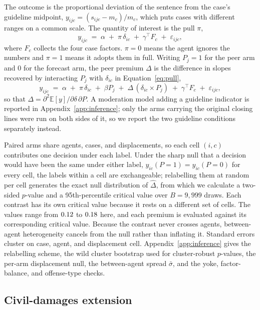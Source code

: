 \documentclass{article}
\begin{document}
The outcome is the proportional deviation of the sentence from the case's guideline midpoint,
$y_{ijc} = (s_{ijc} - m_c)/m_c$, which puts cases with different ranges on a common scale. The
quantity of interest is the pull $\pi$,
\begin{equation}
y_{ijc} \;=\; \alpha \;+\; \pi\,\delta_{ic} \;+\; \gamma^{\top} F_c \;+\; \varepsilon_{ijc},
\label{eq:pull}
\end{equation}
where $F_c$ collects the four case factors. $\pi = 0$ means the agent ignores the numbers and
$\pi = 1$ means it adopts them in full. Writing $P_{j} = 1$ for the peer arm and $0$ for the
forecast arm, the peer premium $\Delta$ is the difference in slopes recovered by interacting $P_j$
with $\delta_{ic}$ in Equation~\ref{eq:pull},
\begin{equation}
y_{ijc} \;=\; \alpha \;+\; \pi\,\delta_{ic} \;+\; \beta P_{j} \;+\;
\Delta\,(\delta_{ic} \times P_{j}) \;+\; \gamma^{\top} F_c \;+\; \varepsilon_{ijc},
\label{eq:premium}
\end{equation}
so that $\Delta = \partial^2 \mathbb{E}[y] / \partial \delta \, \partial P$. A moderation model
adding a guideline indicator is reported in Appendix~\ref{app:inference}; only the arms carrying
the original closing lines were run on both sides of it, so we report the two guideline conditions
separately instead.

Paired arms share agents, cases, and displacements, so each cell $(i,c)$ contributes one decision
under each label. Under the sharp null that a decision would have been the same under either label,
$y_{ic}(P{=}1) = y_{ic}(P{=}0)$ for every cell, the labels within a cell are exchangeable;
relabelling them at random per cell generates the exact null distribution of $\hat\Delta$, from
which we calculate a two-sided $p$-value and a 95th-percentile critical value over $B = 9{,}999$ draws.
Each contrast has its own critical value because it rests on a different set of cells. The values
range from $0.12$ to $0.18$ here, and each premium is evaluated against its corresponding
critical value. Because the contrast never crosses agents, between-agent heterogeneity cancels from
the null rather than inflating it. Standard errors cluster on case, agent, and displacement cell.
Appendix~\ref{app:inference} gives the relabelling scheme, the wild cluster bootstrap used for
cluster-robust $p$-values, the per-arm displacement null, the between-agent spread $\bar\sigma$, and
the yoke, factor-balance, and offense-type checks.

\subsection{Civil-damages extension}
\end{document}
